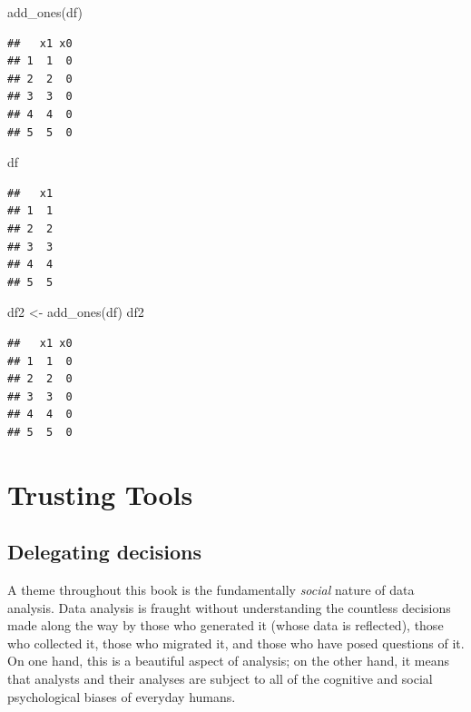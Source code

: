 \documentclass[
]{krantz}
\makeatletter
\newenvironment{Shaded}{\begin{snugshade}}{\end{snugshade}}
\newcommand{\FunctionTok}[1]{\textcolor[rgb]{0,0,0}{#1}}
\newcommand{\NormalTok}[1]{#1}
\newcommand{\OtherTok}[1]{\textcolor[rgb]{0.37,0.37,0.37}{#1}}
\newenvironment{kframe}{%
\medskip{}
\setlength{\fboxsep}{.8em}
 \def\at@end@of@kframe{}%
 \ifinner\ifhmode%
  \def\at@end@of@kframe{\end{minipage}}%
  \begin{minipage}{\columnwidth}%
 \fi\fi%
 \def\FrameCommand##1{\hskip\@totalleftmargin \hskip-\fboxsep
 \colorbox{shadecolor}{##1}\hskip-\fboxsep
     \hskip-\linewidth \hskip-\@totalleftmargin \hskip\columnwidth}%
 \MakeFramed {\advance\hsize-\width
   \@totalleftmargin\z@ \linewidth\hsize
   \@setminipage}}%
 {\par\unskip\endMakeFramed%
 \at@end@of@kframe}
\renewenvironment{Shaded}{\begin{kframe}}{\end{kframe}}
\makeatother
\begin{document}
\begin{Shaded}
\begin{Highlighting}[]
\FunctionTok{add\_ones}\NormalTok{(df)}
\end{Highlighting}
\end{Shaded}

\begin{verbatim}
##   x1 x0
## 1  1  0
## 2  2  0
## 3  3  0
## 4  4  0
## 5  5  0
\end{verbatim}

\begin{Shaded}
\begin{Highlighting}[]
\NormalTok{df}
\end{Highlighting}
\end{Shaded}

\begin{verbatim}
##   x1
## 1  1
## 2  2
## 3  3
## 4  4
## 5  5
\end{verbatim}

\begin{Shaded}
\begin{Highlighting}[]
\NormalTok{df2 }\OtherTok{\textless{}{-}} \FunctionTok{add\_ones}\NormalTok{(df)}
\NormalTok{df2 }
\end{Highlighting}
\end{Shaded}

\begin{verbatim}
##   x1 x0
## 1  1  0
## 2  2  0
## 3  3  0
## 4  4  0
## 5  5  0
\end{verbatim}

\hypertarget{trusting-tools}{%
\section{Trusting Tools}\label{trusting-tools}}

\hypertarget{delegating-decisions}{%
\subsection{Delegating decisions}\label{delegating-decisions}}

A theme throughout this book is the fundamentally \emph{social} nature of data analysis. Data analysis is fraught without understanding the countless decisions made along the way by those who generated it (whose data is reflected), those who collected it, those who migrated it, and those who have posed questions of it. On one hand, this is a beautiful aspect of analysis; on the other hand, it means that analysts and their analyses are subject to all of the cognitive and social psychological biases of everyday humans.
\end{document}
